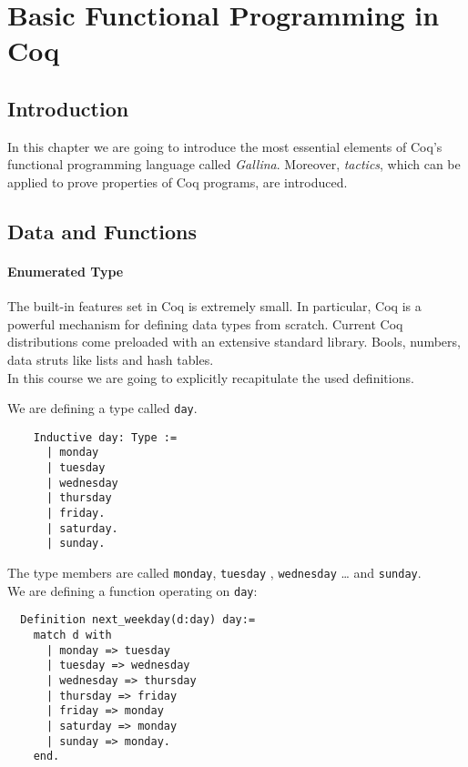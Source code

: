 \section{Basic Functional Programming in Coq}




\subsection{Introduction}

In this chapter we are going to introduce the most essential elements of Coq's functional programming language called {\itshape  Gallina}. 
Moreover, {\itshape tactics}, which can be applied to prove properties of Coq programs, are introduced.


\subsection{Data and Functions}

 \paragraph{Enumerated Type}
 
  The built-in features set in Coq is extremely small. In particular, Coq is a powerful mechanism for defining data types from scratch.
  Current Coq distributions come preloaded with an extensive standard library.
  Bools, numbers, data struts like lists and hash tables.\\
  In this course we are going to explicitly recapitulate the used definitions.
   
  
  \begin{example}
  We are defining a type called \lstinline!day!.
  \begin{lstlisting}
    Inductive day: Type :=
	  | monday
	  | tuesday
	  | wednesday
	  | thursday
	  | friday.
	  | saturday.
	  | sunday.
	  \end{lstlisting} 
  
  The type members are called \lstinline!monday!, \lstinline!tuesday! , \lstinline!wednesday! \ldots{} and \lstinline!sunday!.\\
  
  We are defining a function operating on \lstinline!day!: 
  \begin{lstlisting}
  Definition next_weekday(d:day) day:=
    match d with 
	  | monday => tuesday
	  | tuesday => wednesday
	  | wednesday => thursday
	  | thursday => friday
	  | friday => monday
	  | saturday => monday
	  | sunday => monday.
    end.  
  \end{lstlisting}
  \end{example}

